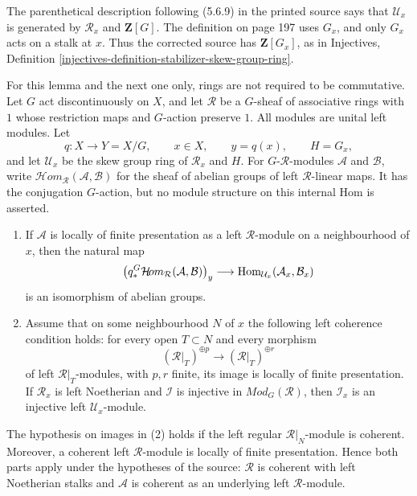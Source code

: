 \begin{lemma}
\label{lemma-equivariant-hom-injective-stalk}
\begin{reference}
\cite[Chapter V, \S 5.6, formula (5.6.9), pp. 214--215]{Tohoku}
\end{reference}
\begin{history}
The parenthetical description following (5.6.9) in the printed source says
that $\mathcal U_x$ is generated by $\mathcal R_x$ and
$\mathbf Z[G]$. The definition on page 197 uses $G_x$, and only $G_x$
acts on a stalk at $x$. Thus the corrected source has
$\mathbf Z[G_x]$, as in Injectives, Definition
\ref{injectives-definition-stabilizer-skew-group-ring}.
\end{history}
For this lemma and the next one only, rings are not required to be
commutative. Let $G$ act discontinuously on $X$, and let $\mathcal R$ be a
$G$-sheaf of associative rings with $1$ whose restriction maps and
$G$-action preserve $1$. All modules are unital left modules. Let
$$
q:X\longrightarrow Y=X/G,
\qquad x\in X,
\qquad y=q(x),
\qquad H=G_x,
$$
and let $\mathcal U_x$ be the skew group ring of $\mathcal R_x$ and $H$.
For $G$-$\mathcal R$-modules $\mathcal A$ and $\mathcal B$, write
$\mathcal H\!om_{\mathcal R}(\mathcal A,\mathcal B)$ for the sheaf of
abelian groups of left $\mathcal R$-linear maps. It has the conjugation
$G$-action, but no module structure on this internal Hom is asserted.
\begin{enumerate}
\item If $\mathcal A$ is locally of finite presentation as a left
$\mathcal R$-module on a neighbourhood of $x$, then the natural map
$$
\left(q_*^G\mathcal H\!om_{\mathcal R}
(\mathcal A,\mathcal B)\right)_y
\longrightarrow
\mathop{\rm Hom}\nolimits_{\mathcal U_x}
(\mathcal A_x,\mathcal B_x)
$$
is an isomorphism of abelian groups.
\item Assume that on some neighbourhood $N$ of $x$ the following left
coherence condition holds: for every open $T\subset N$ and every morphism
$$
(\mathcal R|_T)^{\oplus p}\longrightarrow
(\mathcal R|_T)^{\oplus r}
$$
of left $\mathcal R|_T$-modules, with $p,r$ finite, its image is locally of
finite presentation. If $\mathcal R_x$ is left Noetherian and $\mathcal I$
is injective in $\textit{Mod}_G(\mathcal R)$, then $\mathcal I_x$ is an
injective left $\mathcal U_x$-module.
\end{enumerate}
The hypothesis on images in (2) holds if the left regular
$\mathcal R|_N$-module is coherent. Moreover, a coherent left
$\mathcal R$-module is locally of finite presentation. Hence both parts
apply under the hypotheses of the source: $\mathcal R$ is coherent with
left Noetherian stalks and $\mathcal A$ is coherent as an underlying left
$\mathcal R$-module.
\end{lemma}

